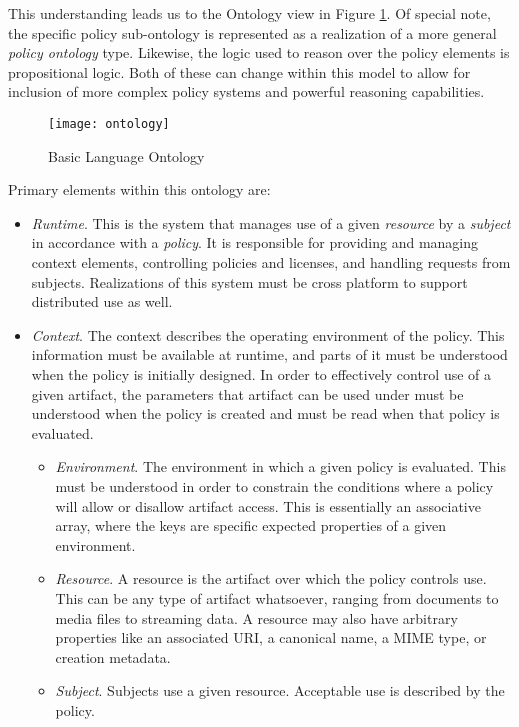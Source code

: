 This understanding leads us to the Ontology view in Figure \ref{fig:model:ontology}.  Of special note, the specific policy sub-ontology is represented as a realization of a more general \textit{policy ontology} type.  Likewise, the logic used to reason over the policy elements is propositional logic.  Both of these can change within this model to allow for inclusion of more complex policy systems and powerful reasoning capabilities.

\begin{figure}[!t]
\centering
\texttt{[image: ontology]}
\caption{Basic Language Ontology}
\label{fig:model:ontology}
\end{figure}

Primary elements within this ontology are:
\begin{itemize}
\item \textit{Runtime}.  This is the system that manages use of a given \textit{resource} by a \textit{subject} in accordance with a \textit{policy}.  It is responsible for providing and managing context elements, controlling policies and licenses, and handling requests from subjects.  Realizations of this system must be cross platform to support distributed use as well.
\item \textit{Context}.  The context describes the operating environment of the policy.  This information must be available at runtime, and parts of it must be understood when the policy is initially designed.  In order to effectively control use of a given artifact, the parameters that artifact can be used under must be understood when the policy is created and must be read when that policy is evaluated.
\begin{itemize}
\item \textit{Environment}.  The environment in which a given policy is evaluated.  This must be understood in order to constrain the conditions where a policy will allow or disallow artifact access.  This is essentially an associative array, where the keys are specific expected properties of a given environment.
\item \textit{Resource}.  A resource is the artifact over which the policy controls use.  This can be any type of artifact whatsoever, ranging from documents to media files to streaming data.  A resource may also have arbitrary properties like an associated URI, a canonical name, a MIME type, or creation metadata.
\item \textit{Subject}.  Subjects use a given resource.  Acceptable use is described by the policy.

\end{itemize}
\end{itemize}
